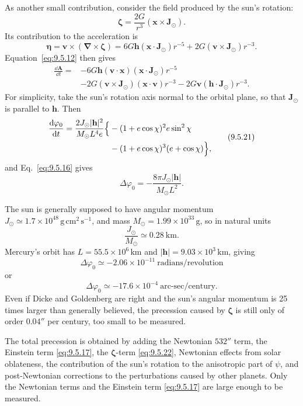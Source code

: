 As another small contribution, consider the field produced by the sun's
rotation:
\begin{equation}
  \boldsymbol\zeta
  =
  \frac{2G}{r^3}(\mathbf x\times\mathbf J_\odot).
  \tag{9.5.18}\label{eq:9.5.18}
\end{equation}
Its contribution to the acceleration is
\begin{equation}
  \boldsymbol\eta
  =
  \mathbf v\times(\boldsymbol\nabla\times\boldsymbol\zeta)
  =
  6G\mathbf h(\mathbf x\cdot\mathbf J_\odot)r^{-5}
  +2G(\mathbf v\times\mathbf J_\odot)r^{-3}.
  \tag{9.5.19}\label{eq:9.5.19}
\end{equation}
Equation~\eqref{eq:9.5.12} then gives
\begin{equation}
  \begin{split}
  \frac{\dd\mathbf A}{\dd t}={}&
  -6G\mathbf h(\mathbf v\cdot\mathbf x)
   (\mathbf x\cdot\mathbf J_\odot)r^{-5}\\
  &-2G(\mathbf v\times\mathbf J_\odot)
   (\mathbf x\cdot\mathbf v)r^{-3}
  -2G\mathbf v(\mathbf h\cdot\mathbf J_\odot)r^{-3}.
  \end{split}
  \tag{9.5.20}\label{eq:9.5.20}
\end{equation}
For simplicity, take the sun's rotation axis normal to the orbital plane, so
that \(\mathbf J_\odot\) is parallel to \(\mathbf h\). Then
\begin{equation}
  \begin{split}
  \frac{\mathop{}\!\mathrm{d}\varphi_0}{\mathop{}\!\mathrm{d} t}
  =
  \frac{2J_\odot|\mathbf h|^2}{M_\odot L^4e}
  \Bigl\{&
  -(1+e\cos\chi)^2e\sin^2\chi\\
  &-(1+e\cos\chi)^3(e+\cos\chi)
  \Bigr\},
  \end{split}
  \tag{9.5.21}\label{eq:9.5.21}
\end{equation}
and Eq.~\eqref{eq:9.5.16} gives
\begin{equation}
  \Delta\varphi_0
  =
  -\frac{8\pi J_\odot|\mathbf h|}{M_\odot L^2}.
  \tag{9.5.22}\label{eq:9.5.22}
\end{equation}

The sun is generally supposed to have angular momentum
\(J_\odot\simeq1.7\times10^{48}\,\mathrm{g\,cm^2\,s^{-1}}\), and mass
\(M_\odot=1.99\times10^{33}\,\mathrm g\), so in natural units
\[
  \frac{J_\odot}{M_\odot}\simeq0.28\ \mathrm{km}.
\]
Mercury's orbit has \(L=55.5\times10^6\,\mathrm{km}\) and
\(|\mathbf h|=9.03\times10^3\,\mathrm{km}\), giving
\[
  \Delta\varphi_0\simeq-2.06\times10^{-11}
  \ \text{radians/revolution}
\]
or
\[
  \Delta\varphi_0\simeq-17.6\times10^{-4}
  \ \text{arc-sec/century}.
\]
Even if Dicke and Goldenberg are right and the sun's angular momentum is
25 times larger than generally believed, the precession caused by
\(\boldsymbol\zeta\) is still only of order \(0.04''\) per century, too
small to be measured.

The total precession is obtained by adding the Newtonian \(532''\) term,
the Einstein term \eqref{eq:9.5.17}, the
\(\boldsymbol\zeta\)-term \eqref{eq:9.5.22}, Newtonian effects from solar
oblateness, the contribution of the sun's rotation to the anisotropic part
of \(\psi\), and post-Newtonian corrections to the perturbations caused by
other planets. Only the Newtonian terms and the Einstein term
\eqref{eq:9.5.17} are large enough to be measured.
